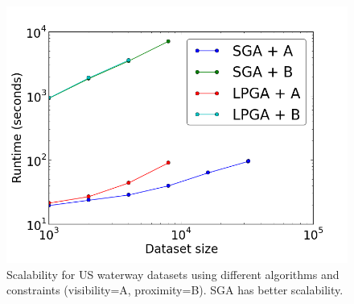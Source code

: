 \begin{figure}[htbp]
\begin{center}
\includegraphics[width=1.0\linewidth]{./figs/scal_lin_30k_uswaterway.png}
\caption{Scalability for US waterway datasets using different algorithms and constraints (visibility=A, proximity=B). SGA has better scalability.}
\label{fig:scalability:complex}
\end{center}
\end{figure}

